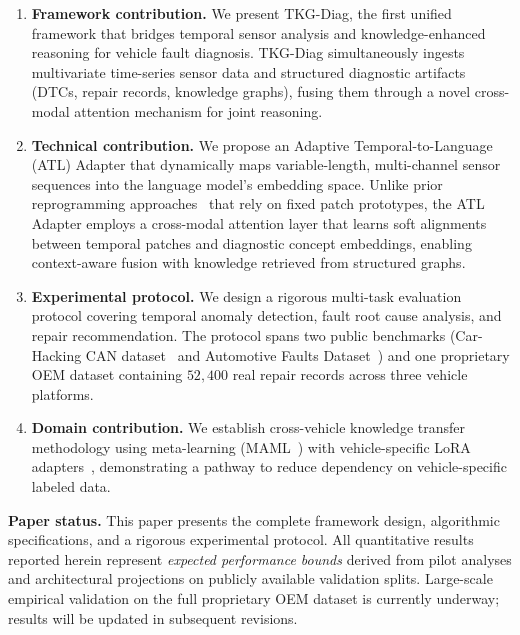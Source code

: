 \documentclass[11pt,a4paper]{article}
\begin{document}
\begin{enumerate}[leftmargin=1.5em]
    \item \textbf{Framework contribution.} We present TKG-Diag, the first unified framework that bridges temporal sensor analysis and knowledge-enhanced reasoning for vehicle fault diagnosis. TKG-Diag simultaneously ingests multivariate time-series sensor data and structured diagnostic artifacts (DTCs, repair records, knowledge graphs), fusing them through a novel cross-modal attention mechanism for joint reasoning.

    \item \textbf{Technical contribution.} We propose an Adaptive Temporal-to-Language (ATL) Adapter that dynamically maps variable-length, multi-channel sensor sequences into the language model's embedding space. Unlike prior reprogramming approaches~\cite{jin2024timellm} that rely on fixed patch prototypes, the ATL Adapter employs a cross-modal attention layer that learns soft alignments between temporal patches and diagnostic concept embeddings, enabling context-aware fusion with knowledge retrieved from structured graphs.

    \item \textbf{Experimental protocol.} We design a rigorous multi-task evaluation protocol covering temporal anomaly detection, fault root cause analysis, and repair recommendation. The protocol spans two public benchmarks (Car-Hacking CAN dataset~\cite{song2020carhacking} and Automotive Faults Dataset~\cite{zenodo2025faults}) and one proprietary OEM dataset containing $52{,}400$ real repair records across three vehicle platforms.

    \item \textbf{Domain contribution.} We establish cross-vehicle knowledge transfer methodology using meta-learning (MAML~\cite{finn2017maml}) with vehicle-specific LoRA adapters~\cite{hu2022lora}, demonstrating a pathway to reduce dependency on vehicle-specific labeled data.
\end{enumerate}

\textbf{Paper status.} This paper presents the complete framework design, algorithmic specifications, and a rigorous experimental protocol. All quantitative results reported herein represent \textit{expected performance bounds} derived from pilot analyses and architectural projections on publicly available validation splits. Large-scale empirical validation on the full proprietary OEM dataset is currently underway; results will be updated in subsequent revisions.
\end{document}
